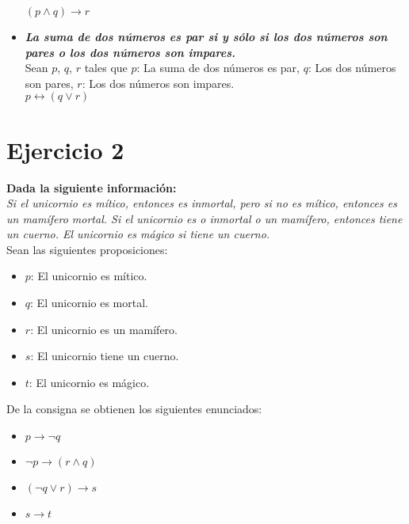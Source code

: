 \documentclass[lnbip]{svmultln}
\begin{document}
\begin{itemize}
  $(p \wedge q) \rightarrow r$ \\

  \item \textbf{\textit{La suma de dos números es par si y sólo si los dos números son pares o
los dos números son impares.}} \\

  Sean $p$, $q$, $r$ tales que $p$: La suma de dos números es par, $q$: Los dos números son pares, $r$: Los dos números son impares. \\

  $p \leftrightarrow (q \vee r)$

\end{itemize}

\section{Ejercicio 2}

\textbf{Dada la siguiente información:} \\

\textit{Si el unicornio es mítico, entonces es inmortal, pero si no es mítico, entonces
es un mamífero mortal. Si el unicornio es o inmortal o un mamífero, entonces
tiene un cuerno. El unicornio es mágico si tiene un cuerno.} \\

Sean las siguientes proposiciones:

\begin{itemize}
  \item $p$: El unicornio es mítico.
  \item $q$: El unicornio es mortal.
  \item $r$: El unicornio es un mamífero.
  \item $s$: El unicornio tiene un cuerno.
  \item $t$: El unicornio es mágico.
\end{itemize}

De la consigna se obtienen los siguientes enunciados:

\begin{itemize}
  \item $p \rightarrow \neg q$
  \item $\neg p \rightarrow (r \wedge q)$
  \item $(\neg q \vee r) \rightarrow s$
  \item $s \rightarrow t$ \\
\end{itemize}
\end{document}
